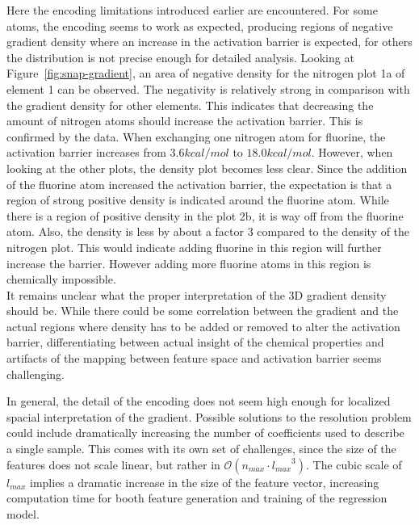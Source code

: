 Here the encoding limitations introduced earlier are encountered.
For some atoms, the encoding seems to work as expected, producing regions of negative gradient density where
an increase in the activation barrier is expected, for others the distribution is not precise enough for detailed analysis.
Looking at Figure~\ref{fig:snap-gradient}, an area of negative density for the nitrogen plot 1a of element 1 can be observed.
The negativity is relatively strong in comparison with the gradient density for other elements.
This indicates that decreasing the amount of nitrogen atoms should increase the activation barrier.
This is confirmed by the data.
When exchanging one nitrogen atom for fluorine, the activation barrier increases from $3.6 kcal/mol$ to $18.0kcal/mol$.
However, when looking at the other plots, the density plot becomes less clear.
Since the addition of the fluorine atom increased the activation barrier, the expectation is that a region of strong positive
density is indicated around the fluorine atom.
While there is a region of positive density in the plot 2b, it is way off from the fluorine atom.
Also, the density is less by about a factor 3 compared to the density of the nitrogen plot.
This would indicate adding fluorine in this region will further increase the barrier.
However adding more fluorine atoms in this region is chemically impossible. %
\\

It remains unclear what the proper interpretation of the 3D gradient density should be.
While there could be some correlation between the gradient and the actual regions where density has to be added or
removed to alter the activation barrier, differentiating between actual insight of the chemical properties and artifacts 
of the mapping between feature space and activation barrier seems challenging.

In general, the detail of the encoding does not seem high enough for localized spacial interpretation of the gradient.
Possible solutions to the resolution problem could include dramatically increasing the number of coefficients used to describe a single sample.
This comes with its own set of challenges, since the size of the features does not scale linear, but rather in $\mathcal{O}(n_{max} \cdot {l_{max}}^3)$.
The cubic scale of $l_{max}$ implies a dramatic increase in the size of the feature vector, increasing computation time for booth feature generation and training of the regression model.
\\

